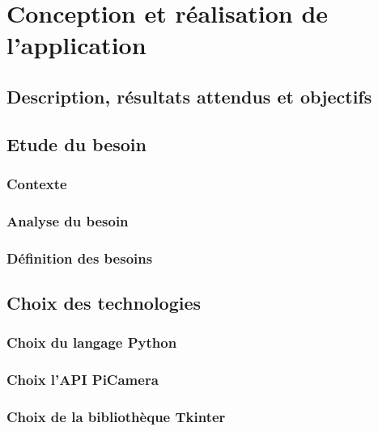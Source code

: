 \chapter{Conception et réalisation de l'application}
\minitoc 

    \section{Description, résultats attendus et objectifs}
    \section{Etude du besoin}
        \subsection{Contexte}
        \subsection{Analyse du besoin}
        \subsection{Définition des besoins}
        
    \section{Choix des technologies}
        \subsection{Choix du langage Python}
        \subsection{Choix l'API PiCamera}
        \subsection{Choix de la bibliothèque Tkinter}